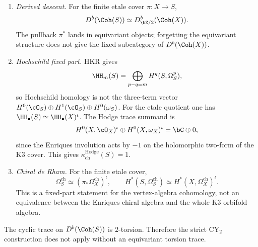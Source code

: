\begin{remark}
\label{rem:enriques-z2-evidence}
\begin{enumerate}[label=\textup{(\arabic*)}]
 \item \emph{Derived descent.} For the finite etale cover $\pi\colon X\to S$,
 \[
 D^b(\Coh(S))\simeq D^b_{\bZ/2}(\Coh(X)).
 \]
 The pullback $\pi^*$ lands in equivariant objects; forgetting the equivariant structure does not give the fixed subcategory of $D^b(\Coh(X))$.
 \item \emph{Hochschild fixed part.} HKR gives
 \[
 \HH_m(S)=\bigoplus_{p-q=m}H^q(S,\Omega_S^p),
 \]
 so Hochschild homology is not the three-term vector
 $H^0(\cO_S)\oplus H^1(\cO_S)\oplus H^0(\omega_S)$.  For the etale quotient one has
 $\HH_\bullet(S)\simeq \HH_\bullet(X)^{\iota}$.  The Hodge trace summand is
 \[
 H^0(X,\cO_X)^{\iota}\oplus H^0(X,\omega_X)^{\iota}
 =
 \bC\oplus 0,
 \]
 since the Enriques involution acts by $-1$ on the holomorphic two-form of the K3 cover.  This gives $\kappa_{\mathrm{ch}}^{\mathrm{Hodge}}(S)=1$.
 \item \emph{Chiral de Rham.} For the finite etale cover,
 \[
 \Omega^{\mathrm{ch}}_S \simeq (\pi_*\Omega_X^{\mathrm{ch}})^{\iota},
 \qquad
 H^*(S,\Omega^{\mathrm{ch}}_S)\simeq H^*(X,\Omega_X^{\mathrm{ch}})^{\iota}.
 \]
 This is a fixed-part statement for the vertex-algebra cohomology, not an equivalence between the Enriques chiral algebra and the whole K3 orbifold algebra.
\end{enumerate}
The cyclic trace on $D^b(\Coh(S))$ is $2$-torsion.  Therefore the strict CY$_2$ construction does not apply without an equivariant torsion trace.
\end{remark}

